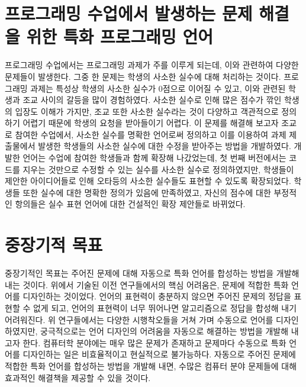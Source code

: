 \documentclass[11pt]{article}
\begin{document}
\begin{spacing}{1.145}
\section{프로그래밍 수업에서 발생하는 문제 해결을 위한 특화 프로그래밍 언어}
%
프로그래밍 수업에서는 프로그래밍 과제가 주를 이루게 되는데, 이와 관련하여 다양한 문제들이 발생한다.
%
그중 한 문제는 학생의 사소한 실수에 대해 처리하는 것이다.
%
프로그래밍 과제는 특성상 학생의 사소한 실수가 0점으로 이어질 수 있고, 이와 관련된 학생과 조교 사이의 갈등을 많이 경험하였다.
%
사소한 실수로 인해 많은 점수가 깎인 학생의 입장도 이해가 가지만, 조교 또한 사소한 실수라는 것이 다양하고 객관적으로 정의하기 어렵기 때문에 학생의 요청을 받아들이기 어렵다.
%
이 문제를 해결해 보고자 조교로 참여한 수업에서, 사소한 실수를 명확한 언어로써 정의하고 이를 이용하여 과제 제출물에서 발생한 학생들의 사소한 실수에 대한 수정을 받아주는 방법을 개발하였다.
%
개발한 언어는 수업에 참여한 학생들과 함께 확장해 나갔었는데, 첫 번째 버전에서는 코드를 지우는 것만으로 수정할 수 있는 실수를 사소한 실수로 정의하였지만, 학생들이 제안한 아이디어들로 인해 오타등의 사소한 실수들도 표현할 수 있도록 확장되었다.
%
학생들 또한 실수에 대한 명확한 정의가 있음에 만족하였고, 자신의 점수에 대한 부정적인 항의들은 실수 표현 언어에 대한 건설적인 확장 제안들로 바뀌었다.


\section{중장기적 목표}
%
중장기적인 목표는 주어진 문제에 대해 자동으로 특화 언어를 합성하는 방법을 개발해 내는 것이다.
%
위에서 기술된 이전 연구들에서의 핵심 어려움은, 문제에 적합한 특화 언어를 디자인하는 것이었다.
%
언어의 표현력이 충분하지 않으면 주어진 문제의 정답을 표현할 수 없게 되고, 언어의 표현력이 너무 뛰어나면 알고리즘으로 정답을 합성해 내기 어려워진다.
%
위 연구들에서는 다양한 시행착오들을 거쳐 가며 수동으로 언어를 디자인하였지만, 궁극적으로는 언어 디자인의 어려움을 자동으로 해결하는 방법을 개발해 내고자 한다.
%
컴퓨터학 분야에는 매우 많은 문제가 존재하고 문제마다 수동으로 특화 언어를 디자인하는 일은 비효율적이고 현실적으로 불가능하다.
%
자동으로 주어진 문제에 적합한 특화 언어를 합성하는 방법을 개발해 내면, 수많은 컴퓨터 분야 문제들에 대해 효과적인 해결책을 제공할 수 있을 것이다.












\end{spacing}
\end{document}

